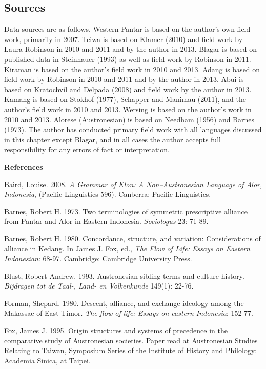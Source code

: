 \subsection[Sources]{Sources}
\hypertarget{RefHeading78045871885726}{}Data sources are as follows. Western Pantar is based on the author{\textquoteright}s own field work, primarily in 2007. Teiwa is based on Klamer (2010) and field work by Laura Robinson in 2010 and 2011 and by the author in 2013. Blagar is based on published data in Steinhauer (1993) as well as field work by Robinson in 2011. Kiraman is based on the author{\textquoteright}s field work in 2010 and 2013. Adang is based on field work by Robinson in 2010 and 2011 and by the author in 2013. Abui is based on Kratochv\'il and Delpada (2008) and field work by the author in 2013. Kamang is based on Stokhof (1977), Schapper and Manimau (2011), and the author{\textquoteright}s field work in 2010 and 2013. Wersing is based on the author{\textquoteright}s work in 2010 and 2013. Alorese (Austronesian) is based on Needham (1956) and Barnes (1973). The author has conducted primary field work with all languages discussed in this chapter except Blagar, and in all cases the author accepts 
full responsibility for any errors of fact or interpretation.

{\bfseries
References}

Baird, Louise. 2008. \textit{A Grammar of Klon: A Non--Austronesian Language of Alor, Indonesia}, (Pacific Linguistics 596). Canberra: Pacific Linguistics.

Barnes, Robert H. 1973. Two terminologies of symmetric prescriptive alliance from Pantar and Alor in Eastern Indonesia. \textit{Sociologus} 23: 71-89.

Barnes, Robert H. 1980. Concordance, structure, and variation: Considerations of alliance in Kedang. In James J. Fox, ed., \textit{The Flow of Life: Essays on Eastern Indonesian}: 68-97. Cambridge: Cambridge University Press.

Blust, Robert Andrew. 1993. Austronesian sibling terms and culture history. \textit{Bijdragen tot de Taal-, Land- en Volkenkunde} 149(1): 22-76.

Forman, Shepard. 1980. Descent, alliance, and exchange ideology among the Makassae of East Timor. \textit{The flow of life: Essays on eastern Indonesia}: 152-77.

Fox, James J. 1995. Origin structures and systems of precedence in the comparative study of Austronesian societies. Paper read at Austronesian Studies Relating to Taiwan, Symposium Series of the Institute of History and Philology: Academia Sinica, at Taipei.

